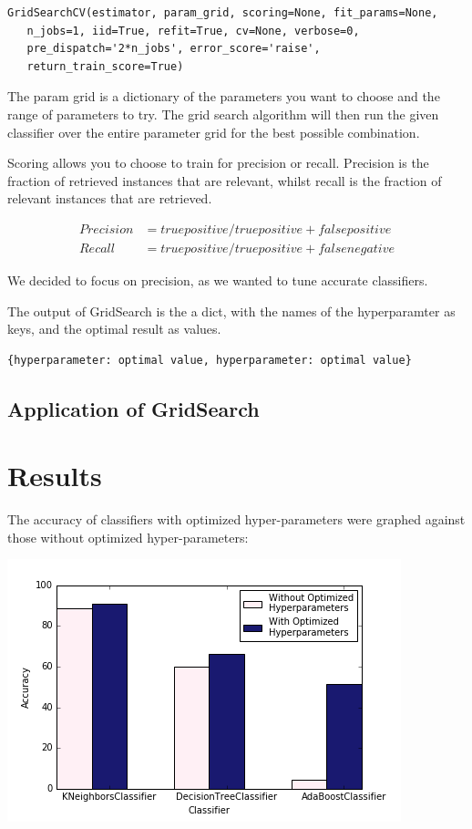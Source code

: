 \documentclass{article}
\begin{document}
		
	\begin{lstlisting}
GridSearchCV(estimator, param_grid, scoring=None, fit_params=None, 
   n_jobs=1, iid=True, refit=True, cv=None, verbose=0, 
   pre_dispatch='2*n_jobs', error_score='raise',
   return_train_score=True)
	\end{lstlisting}
		
		The param \textunderscore grid is a dictionary of the parameters you want to choose and the range of parameters to try. The grid search algorithm will then run the given classifier over the entire parameter grid for the best possible combination. 
		
		Scoring allows you to choose to train for precision or recall. Precision is the fraction of retrieved instances that are relevant, whilst recall is the fraction of relevant instances that are retrieved.
		
		\begin{align*}
		Precision &= true positive / true positive + false positive\\
		Recall &= true positive / true positive + false negative 
		\end{align*}
		
		We decided to focus on precision, as we wanted to tune accurate classifiers. 
		
		The output of GridSearch is the a dict, with the names of the hyperparamter as keys, and the optimal result as values. 
		
		\begin{lstlisting}
{hyperparameter: optimal value, hyperparameter: optimal value}
		\end{lstlisting}


	\subsection{Application of GridSearch}




\newpage
\section{Results}

The accuracy of classifiers with optimized hyper-parameters were graphed against those without optimized hyper-parameters:

\includegraphics[scale=0.7]{acc_class}
\end{document}
